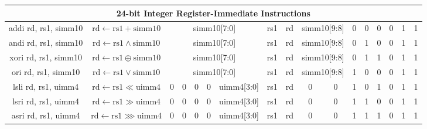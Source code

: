 \documentclass[a4paper,10pt]{article}
\begin{document}
\begin{landscape}
\begin{longtable}[c]{|c|c|@{}c@{}|@{}c@{}|@{}c@{}|@{}c@{}|@{}c@{}|@{}c@{}|@{}c@{}|@{}c@{}|@{}c@{}|@{}c@{}|@{}c@{}|@{}c@{}|@{}c@{}|@{}c@{}|@{}c@{}|@{}c@{}|@{}c@{}|@{}c@{}|@{}c@{}|@{}c@{}|@{}c@{}|@{}c@{}|@{}c@{}|@{}c@{}|}
\hline
\multicolumn{26}{|c|}{24-bit Integer Register-Immediate Instructions}                                                                                                                                                                                                                                                             \\\hline
addi rd, rs1, simm10  & $\mathrm{rd} \leftarrow \mathrm{rs1} + \mathrm{simm10}$ & \multicolumn{8}{c|}{simm10{[}7:0{]}}                        & \multicolumn{4}{c|}{rs1}            & \multicolumn{4}{c|}{rd}      & \multicolumn{2}{c|}{simm10{[}9:8{]}} & 0   & 0   & 0   & 0 & 1 & 1 \\
andi rd, rs1, simm10  & $\mathrm{rd} \leftarrow \mathrm{rs1} \land \mathrm{simm10}$ & \multicolumn{8}{c|}{simm10{[}7:0{]}}                        & \multicolumn{4}{c|}{rs1}            & \multicolumn{4}{c|}{rd}      & \multicolumn{2}{c|}{simm10{[}9:8{]}} & 0   & 1   & 0   & 0 & 1 & 1 \\
xori rd, rs1, simm10  & $\mathrm{rd} \leftarrow \mathrm{rs1} \oplus \mathrm{simm10}$ & \multicolumn{8}{c|}{simm10{[}7:0{]}}                        & \multicolumn{4}{c|}{rs1}            & \multicolumn{4}{c|}{rd}      & \multicolumn{2}{c|}{simm10{[}9:8{]}} & 0   & 1   & 1   & 0 & 1 & 1 \\
ori rd, rs1, simm10   & $\mathrm{rd} \leftarrow \mathrm{rs1} \lor \mathrm{simm10}$ & \multicolumn{8}{c|}{simm10{[}7:0{]}}                        & \multicolumn{4}{c|}{rs1}            & \multicolumn{4}{c|}{rd}      & \multicolumn{2}{c|}{simm10{[}9:8{]}} & 1   & 0   & 0   & 0 & 1 & 1 \\
lsli rd, rs1, uimm4   & $\mathrm{rd} \leftarrow \mathrm{rs1} \ll \mathrm{uimm4}$ & 0 & 0 & 0 & 0 & \multicolumn{4}{c|}{uimm4{[}3:0{]}} & \multicolumn{4}{c|}{rs1}            & \multicolumn{4}{c|}{rd}      & 0              & 0              & 1   & 0   & 1   & 0 & 1 & 1 \\
lsri rd, rs1, uimm4   & $\mathrm{rd} \leftarrow \mathrm{rs1} \gg \mathrm{uimm4}$ & 0 & 0 & 0 & 0 & \multicolumn{4}{c|}{uimm4{[}3:0{]}} & \multicolumn{4}{c|}{rs1}            & \multicolumn{4}{c|}{rd}      & 0              & 0              & 1   & 1   & 0   & 0 & 1 & 1 \\
asri rd, rs1, uimm4   & $\mathrm{rd} \leftarrow \mathrm{rs1} \ggg \mathrm{uimm4}$ & 0 & 0 & 0 & 0 & \multicolumn{4}{c|}{uimm4{[}3:0{]}} & \multicolumn{4}{c|}{rs1}            & \multicolumn{4}{c|}{rd}      & 0              & 0              & 1   & 1   & 1   & 0 & 1 & 1 \\


\end{longtable}
\end{landscape}
\end{document}
